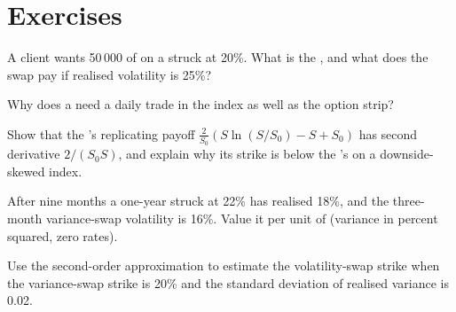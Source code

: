 \section{Exercises}

\begin{exercise}[$\star$]\label{exo:dv:variance-swaps-and-volatility-derivatives:1}
A client wants 50\,000 of  on a  struck at 20\%. What is the , and what
does the swap pay if realised volatility is 25\%?
\end{exercise}

\begin{exercise}[$\star$]\label{exo:dv:variance-swaps-and-volatility-derivatives:2}
Why does a  need a daily trade in the index as well as the option strip?
\end{exercise}

\begin{exercise}[$\star$]\label{exo:dv:variance-swaps-and-volatility-derivatives:3}
Show that the 's replicating payoff $\frac2{S_0}(S\ln(S/S_0)-S+S_0)$ has second derivative $2/(S_0S)$,
and explain why its strike is below the 's on a downside-skewed index.
\end{exercise}

\begin{exercise}[$\star\star$]\label{exo:dv:variance-swaps-and-volatility-derivatives:4}
After nine months a one-year  struck at 22\% has realised 18\%, and the three-month variance-swap
volatility is 16\%. Value it per unit of  (variance in percent squared, zero rates).
\end{exercise}

\begin{exercise}[$\star\star$]\label{exo:dv:variance-swaps-and-volatility-derivatives:5}
Use the second-order approximation to estimate the volatility-swap strike when the variance-swap strike is 20\%
and the standard deviation of realised variance is 0.02.
\end{exercise}

